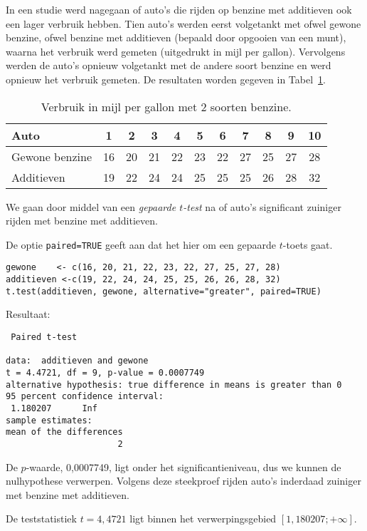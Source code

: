 \begin{example}
  In een studie werd nagegaan of auto's die rijden op benzine met additieven ook een lager verbruik hebben. Tien auto's werden eerst volgetankt met ofwel gewone benzine, ofwel benzine met additieven (bepaald door opgooien van een munt), waarna het verbruik werd gemeten (uitgedrukt in mijl per gallon). Vervolgens werden de auto's opnieuw volgetankt met de andere soort benzine en werd opnieuw het verbruik gemeten. De resultaten worden gegeven in Tabel~\ref{tab:benzineverbruik-additieven}.
  
  \begin{table}
    \centering
    \begin{tabular}{|l|c|c|c|c|c|c|c|c|c|c|}
      \hline 
      Auto & 1 & 2 & 3 & 4 & 5 & 6 & 7 & 8 & 9 & 10 \\ 
      \hline 
      Gewone benzine & 16 & 20 & 21 & 22 & 23 & 22 & 27 & 25 & 27 & 28 \\ 
      \hline 
      Additieven & 19 & 22 & 24 & 24 & 25 & 25 & 25 & 26 & 28 & 32 \\ 
      \hline 
    \end{tabular} 
  \caption{Verbruik in mijl per gallon met 2 soorten benzine.}
  \label{tab:benzineverbruik-additieven}
  \end{table}
  
  We gaan door middel van een \emph{gepaarde $t$-test} na of auto's significant zuiniger rijden met benzine met additieven.
  
  De optie \texttt{paired=TRUE} geeft aan dat het hier om een gepaarde $t$-toets gaat.
  
\begin{lstlisting}
gewone    <- c(16, 20, 21, 22, 23, 22, 27, 25, 27, 28)
additieven <-c(19, 22, 24, 24, 25, 25, 26, 26, 28, 32)
t.test(additieven, gewone, alternative="greater", paired=TRUE)
\end{lstlisting}

  Resultaat:
  
\begin{verbatim}
 Paired t-test

data:  additieven and gewone
t = 4.4721, df = 9, p-value = 0.0007749
alternative hypothesis: true difference in means is greater than 0
95 percent confidence interval:
 1.180207      Inf
sample estimates:
mean of the differences 
                      2 
\end{verbatim}

  De $p$-waarde, 0,0007749, ligt onder het significantieniveau, dus we kunnen de nulhypothese verwerpen. Volgens deze steekproef rijden auto's inderdaad zuiniger met benzine met additieven.
  
  De teststatistiek $t = 4,4721$ ligt binnen het verwerpingsgebied $[1,180207; +\infty]$.
\end{example}

